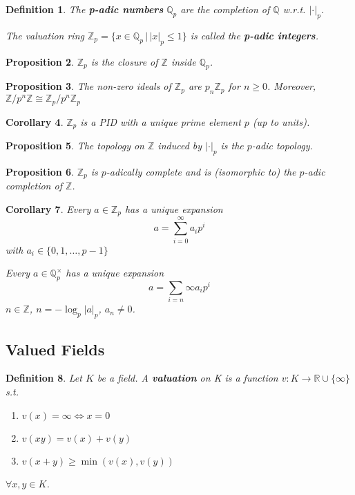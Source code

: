 \documentclass[a4paper]{article}
\newtheorem{definition}{Definition}
\newtheorem{prop}[definition]{Proposition}
\newtheorem{corollary}[definition]{Corollary}
\newcommand*\abs[1]{\left|#1\right|}
\begin{document}
\begin{definition}
	The \textbf{p-adic numbers} $\mathbb{Q}_p$ are the completion of $\mathbb{Q}$ w.r.t. $\abs{\cdot}_p$.
	
	The valuation ring $\mathbb{Z}_p = \{x \in \mathbb{Q}_p \,|\, \abs{x}_p \leq 1 \}$ is called the \textbf{p-adic integers}.
\end{definition}

\begin{prop}
	$\mathbb{Z}_p$ is the closure of $\mathbb{Z}$ inside $\mathbb{Q}_p$.
\end{prop}

\begin{prop}
	The non-zero ideals of $\mathbb{Z}_p$ are $p_n\mathbb{Z}_p$ for $n \geq 0$. Moreover, $\mathbb{Z}/p^n\mathbb{Z} \cong \mathbb{Z}_p/p^n\mathbb{Z}_p$
\end{prop}

\begin{corollary}
	$\mathbb{Z}_p$ is a PID with a unique prime element $p$ (up to units).
\end{corollary}

\begin{prop}
	The topology on $\mathbb{Z}$ induced by $\abs{\cdot}_p$ is the $p$-adic topology.
\end{prop}

\begin{prop}
	$\mathbb{Z}_p$ is $p$-adically complete and is (isomorphic to) the $p$-adic completion of $\mathbb{Z}$.
\end{prop}

\begin{corollary}
	Every $a \in \mathbb{Z}_p$ has a unique expansion $$a = \sum_{i=0}^\infty a_ip^i$$ with $a_i \in \{0, 1, \dots, p-1\}$
	
	Every $a \in \mathbb{Q}_p^\times$ has a unique expansion $$a = \sum_{i=n}{\infty}a_ip^i$$ $n \in \mathbb{Z}$, $n = -\log_p\abs{a}_p$, $a_n \neq 0$.
\end{corollary}

\subsection{Valued Fields}
\begin{definition}
	Let $K$ be a field. A \textbf{valuation} on K is a function $v : K \to \mathbb{R} \cup \{\infty\}$ s.t.
	\begin{enumerate}[label=\roman*.]
		\item $v(x) = \infty \iff x = 0$
		\item $v(xy) = v(x)+v(y)$
		\item $v(x+y) \geq \min(v(x), v(y))$
	\end{enumerate}
	$\forall x, y \in K$.
\end{definition}
\end{document}

